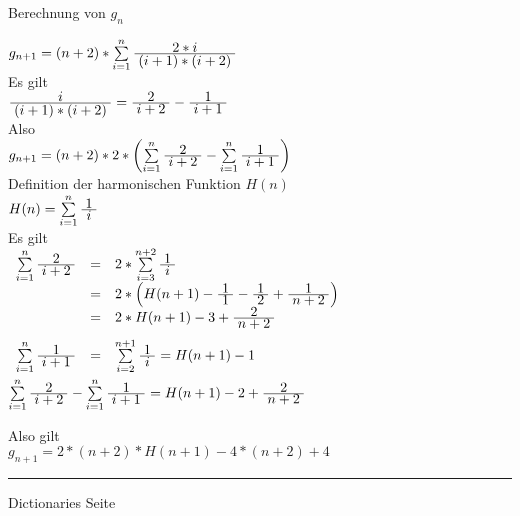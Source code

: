 
\begin{slide}{}
\normalsize

\begin{center}
Berechnung von $g_n$
\end{center}
\vspace*{0.5cm}

\footnotesize
 \hspace*{1.3cm} $g_{n+1} = (n+2) * \sum\limits_{i=1}^n \frac{\displaystyle\;2*i\;}{\displaystyle\;(i+1)*(i+2)\;}$ \\[0.3cm]
Es gilt \\[0.3cm]
\hspace*{1.3cm} $\frac{\displaystyle\;i\;}{\displaystyle\;(i+1)*(i+2)\;} = \frac{\displaystyle\;2\;}{\displaystyle\;i+2\;} - \frac{\displaystyle\;1\;}{\displaystyle\;i+1\;}$ \\[0.3cm]
Also \\[0.3cm]
\hspace*{1.3cm} $g_{n+1} = (n+2) * 2 * \left(\sum\limits_{i=1}^n \frac{\displaystyle\;2\;}{\displaystyle\;i+2\;} - \sum\limits_{i=1}^n \frac{\displaystyle\;1\;}{\displaystyle\;i+1\;}\right)$ \\[0.3cm]
Definition der harmonischen Funktion $H(n)$ \\[0.3cm]
\hspace*{1.3cm} $H(n) = \sum\limits_{i=1}^n \frac{\displaystyle\;1\;}{\displaystyle\;i\;}$ \\[0.3cm]
Es gilt \\[0.3cm]
\hspace*{1.3cm} $
\begin{array}{lcl}
\sum\limits_{i=1}^n \frac{\displaystyle\;2\;}{\displaystyle\;i+2\;} & = & 2 * \sum\limits_{i=3}^{n+2} \frac{\displaystyle\;1\;}{\displaystyle\;i\;} \\
                                   & = & 2 * \left( H(n+1) - \frac{\displaystyle\;1\;}{\displaystyle\;1\;} - \frac{\displaystyle\;1\;}{\displaystyle\;2\;} +  \frac{\displaystyle\;1\;}{\displaystyle\;n+2\;} \right)\\
                                   & = & 2 * H(n+1) - 3 + \frac{\displaystyle\;2\;}{\displaystyle\;n+2\;} \\[0.3cm]
\sum\limits_{i=1}^n \frac{\displaystyle\;1\;}{\displaystyle\;i+1\;} & = &  \sum\limits_{i=2}^{n+1} \frac{\displaystyle\;1\;}{\displaystyle\;i\;} = H(n+1) - 1 \\[0.3cm]
\end{array}
$ \\[0.5cm]
$\sum\limits_{i=1}^n \frac{\displaystyle\;2\;}{\displaystyle\;i+2\;} - \sum\limits_{i=1}^n \frac{\displaystyle\;1\;}{\displaystyle\;i+1\;} =  H(n+1) - 2 + \frac{\displaystyle\;2\;}{\displaystyle\;n+2\;}$

Also gilt \\[0.3cm]
\hspace*{1.3cm} $g_{n+1} = 2 * (n+2) * H(n+1) - 4 *(n+2) + 4$

\vspace*{\fill}
\tiny \addtocounter{mypage}{1}
\rule{17cm}{1mm}
Dictionaries  \hspace*{\fill} Seite 
\end{slide}

